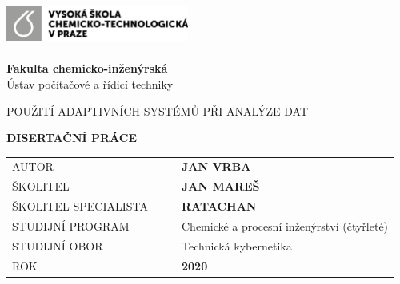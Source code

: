 \cleardoublepage
\thispagestyle{empty}
\noindent
\includegraphics[width=0.45\textwidth]{IMG/TOP/logoVSCHT_zakl_CB.png} \\
\vspace{10mm}
\\
{\Large \textbf{Fakulta  chemicko-inženýrská}
\\ [5mm]
Ústav počítačové a řídicí techniky}

\vspace{40mm}


\begin{spacing}{0.9}
\Huge\noindent POUŽITÍ ADAPTIVNÍCH SYSTÉMŮ PŘI ANALÝZE DAT\\ 
\end{spacing}
\vspace{30mm}

\noindent
{\Large \textbf{DISERTAČNÍ PRÁCE}} 

\vspace{15mm}

\begin{table}[!h]
\begin{tabular}{  l l |l  l }
\hspace{-0.5em}AUTOR & \hspace{0mm} & & {\Large \textbf{JAN VRBA}} \\ [7mm]
\hspace{-0.5em}ŠKOLITEL &  &  & \textbf{\large JAN MAREŠ}\\ [7mm]
\hspace{-0.5em}ŠKOLITEL  SPECIALISTA             &     &   & {\textbf{\large RATACHAN}} \\ [7mm]
\hspace{-0.5em}STUDIJNÍ PROGRAM &  &  & {\large Chemické a procesní inženýrství (čtyřleté)} \\ [7mm]
\hspace{-0.5em}STUDIJNÍ OBOR    & &   & {\large Technická kybernetika}\\ [7mm]
\hspace{-0.5em}ROK          &       &   & \textbf{2020} \\
\end{tabular}


\end{table}

